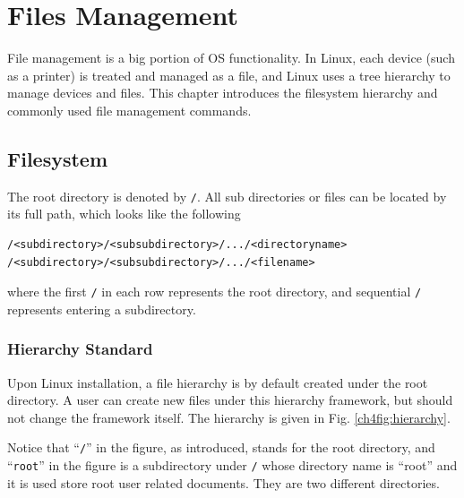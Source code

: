 \chapter{Files Management}

File management is a big portion of OS functionality. In Linux, each device (such as a printer) is treated and managed as a file, and Linux uses a tree hierarchy to manage devices and files. This chapter introduces the filesystem hierarchy and commonly used file management commands.

\section{Filesystem} \label{ch4sec:hierarchy}

The root directory is denoted by \verb|/|. All sub directories or files can be located by its full path, which looks like the following
\begin{lstlisting}
/<subdirectory>/<subsubdirectory>/.../<directoryname>
/<subdirectory>/<subsubdirectory>/.../<filename>
\end{lstlisting}
where the first \verb|/| in each row represents the root directory, and sequential \verb|/| represents entering a subdirectory.

\subsection{Hierarchy Standard}

Upon Linux installation, a file hierarchy is by default created under the root directory. A user can create new files under this hierarchy framework, but should not change the framework itself. The hierarchy is given in Fig. \ref{ch4fig:hierarchy}. 

Notice that ``\verb|/|'' in the figure, as introduced, stands for the root directory, and ``\verb|root|'' in the figure is a subdirectory under \verb|/| whose directory name is ``root'' and it is used store root user related documents. They are two different directories.

